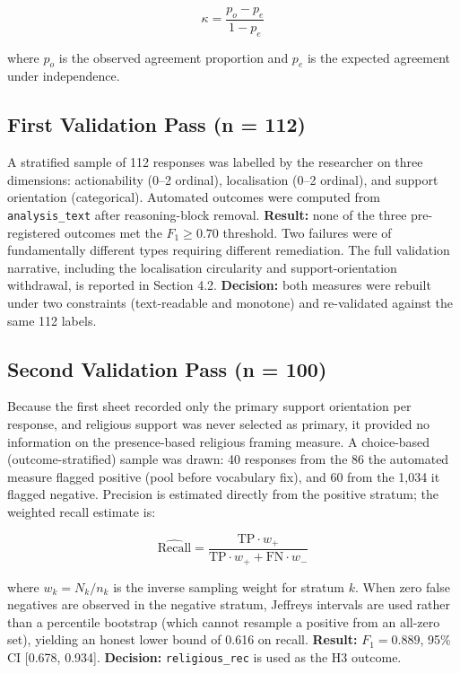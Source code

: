 \begin{equation}
\kappa = \frac{p_o - p_e}{1 - p_e}
\label{eq:kappa}
\end{equation}

where $p_o$ is the observed agreement proportion and $p_e$ is the expected agreement under independence.

\subsection{First Validation Pass (n = 112)}

A stratified sample of 112 responses was labelled by the researcher on three dimensions: actionability (0--2 ordinal), localisation (0--2 ordinal), and support orientation (categorical). Automated outcomes were computed from \texttt{analysis\_text} after reasoning-block removal. \textbf{Result:} none of the three pre-registered outcomes met the $F_1 \geq 0.70$ threshold. Two failures were of fundamentally different types requiring different remediation. The full validation narrative, including the localisation circularity and support-orientation withdrawal, is reported in Section 4.2. \textbf{Decision:} both measures were rebuilt under two constraints (text-readable and monotone) and re-validated against the same 112 labels.

\subsection{Second Validation Pass (n = 100)}

Because the first sheet recorded only the primary support orientation per response, and religious support was never selected as primary, it provided no information on the presence-based religious framing measure. A choice-based (outcome-stratified) sample was drawn: 40 responses from the 86 the automated measure flagged positive (pool before vocabulary fix), and 60 from the 1,034 it flagged negative. Precision is estimated directly from the positive stratum; the weighted recall estimate is:

\begin{equation}
\widehat{\text{Recall}} = \frac{\text{TP} \cdot w_+}{\text{TP} \cdot w_+ + \text{FN} \cdot w_-}
\label{eq:recall}
\end{equation}

where $w_k = N_k/n_k$ is the inverse sampling weight for stratum $k$. When zero false negatives are observed in the negative stratum, Jeffreys intervals are used rather than a percentile bootstrap (which cannot resample a positive from an all-zero set), yielding an honest lower bound of 0.616 on recall. \textbf{Result:} $F_1 = 0.889$, 95\% CI [0.678, 0.934]. \textbf{Decision:} \texttt{religious\_rec} is used as the H3 outcome.

